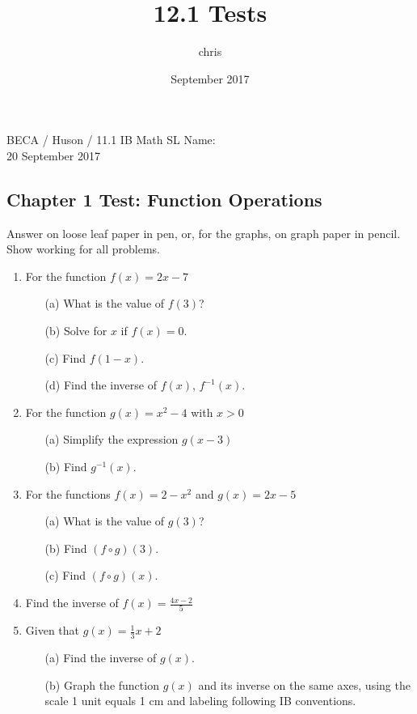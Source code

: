 \documentclass{article}
\title{12.1 Tests}
\author{chris }
\date{September 2017}
\begin{document}
\noindent BECA / Huson / 11.1 IB Math SL \qquad \qquad Name:\\
20 September 2017
\subsection*{Chapter 1 Test: Function Operations}
Answer on loose leaf paper in pen, or, for the graphs, on graph paper in pencil. Show working for all problems.

\begin{enumerate}

\item For the function $f(x) = 2x-7$
\begin{itemize}
    \item[(a)] What is the value of $f(3)$?
	\item[(b)] Solve for $x$ if $f(x)=0$.
	\item[(c)] Find  $f(1-x)$.
	\item[(d)] Find the inverse of $f(x)$,  $f^{-1}(x)$.
\end{itemize}

\item For the function $g(x) = x^2-4$ with $x>0$
\begin{itemize}
    \item[(a)] Simplify the expression $g(x-3)$
	\item[(b)] Find  $g^{-1}(x)$.
\end{itemize}

\item For the functions $f(x) = 2-x^2$ and $g(x) = 2x-5$
\begin{itemize}
    \item[(a)] What is the value of $g(3)$?
	\item[(b)] Find $(f\circ g)(3)$.
	\item[(c)] Find $(f\circ g)(x)$.
\end{itemize}

\item Find the inverse of $\displaystyle f(x)= \frac {4x-2}{5}$

\item Given that $g(x) = \frac {1}{3} x+2$
\begin{itemize}
    \item[(a)] Find the inverse of $g(x)$.
	\item[(b)] Graph the function $g(x)$ and its inverse on the same axes, using the scale 1 unit equals 1 cm and labeling following IB conventions.
\end{itemize}


\end{enumerate}
\end{document}
